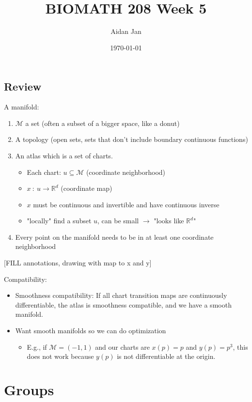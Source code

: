 \documentclass[10pt]{article}
\title{BIOMATH 208 Week 5}
\author{Aidan Jan}
\date{\today}
\newcommand{\R}{\mathbb{R}}
\begin{document}
\maketitle
\subsection*{Review}
A manifold:
\begin{enumerate}
    \item $\mathcal{M}$ a set (often a subset of a bigger space, like a donut)
    \item A topology (open sets, sets that don't include boundary continuous functions)
    \item An atlas which is a set of charts.
    \begin{itemize}
        \item Each chart: $u \subseteq \mathcal{M}$ (coordinate neighborhood)
        \item $x \::\: u \rightarrow \R^d$ (coordinate map)
        \item $x$ must be continuous and invertible and have continuous inverse
        \item "locally" find a subset $u$, can be small $\rightarrow$ "looks like $\R^d$"
    \end{itemize}
    \item Every point on the manifold needs to be in at least one coordinate neighborhood
\end{enumerate}
\begin{center}
    [FILL annotations, drawing with map to x and y]
\end{center}
Compatibility:
\begin{itemize}
    \item Smoothness compatibility: If all chart transition maps are continuously differentiable, the atlas is smoothness compatible, and we have a smooth manifold.
    \item Want smooth manifolds so we can do optimization
    \begin{itemize}
        \item E.g., if $\mathcal{M} = (-1, 1)$ and our charts are $x(p) = p$ and $y(p) = p^3$, this does not work because $y(p)$ is not differentiable at the origin.
    \end{itemize}
\end{itemize}

\section*{Groups}
\end{document}
